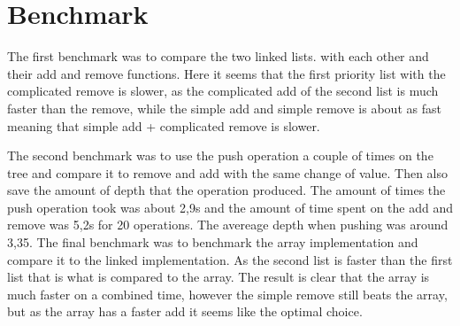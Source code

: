 \documentclass[a4paper,11pt]{article}
\begin{document}
\section*{Benchmark}
The first benchmark was to compare the two linked lists. with each other and their add and remove functions. Here it seems that the first priority list with the complicated remove is slower, as the complicated add of the second list is 
much faster than the remove, while the simple add and simple remove is about as fast meaning that simple add + complicated remove is slower.
\newline
\begin{table}[h]
    \begin{center}
    \caption{The result between the two linked lists combined}
    \label{tab:table1}
    \end{center}
\end{table}
\newline
\FloatBarrier{\noindent}
The second benchmark was to use the push operation a couple of times on the tree and compare it to remove and add with the same change of value. Then also save the amount of depth that the operation produced. 
The amount of times the push operation took was about 2,9{\textmu}s and the amount of time spent on the add and remove was 5,2{\textmu}s for 20 operations.
The avereage depth when pushing was around 3,35.
\newline
\newline
The final benchmark was to benchmark the array implementation and compare it to the linked implementation. As the second list is faster than the first list that 
is what is compared to the array. The result is clear that the array is much faster on a combined time, however the simple remove still beats the array, but as the array has a faster add it seems like the optimal choice.
\end{document}
